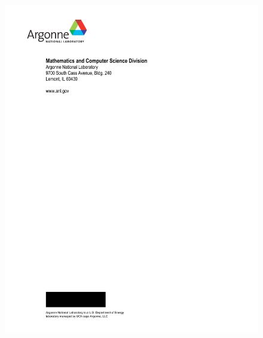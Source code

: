 \pagestyle{empty}
\begin{figure}[hbt]
\centerline{\includegraphics{ArgonneReportTemplateLastPage.pdf}}
\caption{}
\end{figure}


